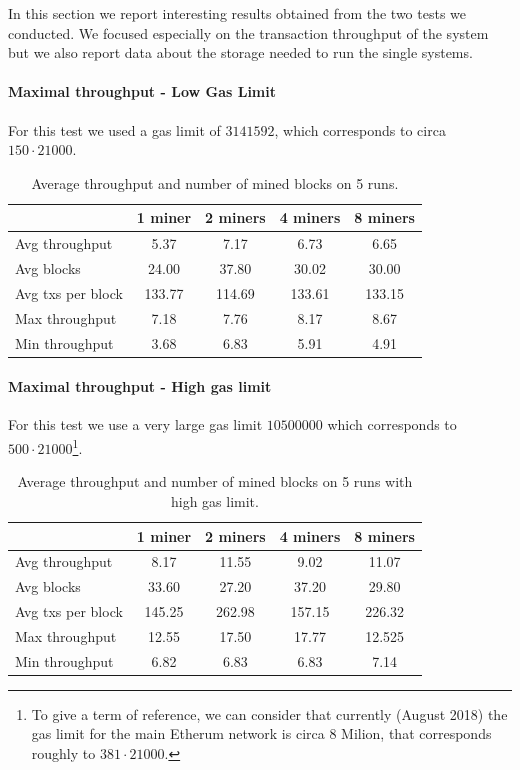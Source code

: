 In this section we report interesting results obtained from the two tests we
conducted. We focused especially on the transaction throughput of the system
but we also report data about the storage needed to run the single systems.  

\paragraph{Maximal throughput - Low Gas Limit}
\label{sec:max-troughput}
For this test we used a gas limit of $3141592$, which corresponds to circa
$150 \cdot 21000$.

\begin{table}[h]
  \centering
  \begin{tabular}{l | cccc}
    & 1 miner & 2 miners & 4 miners & 8 miners \\ \hline
    Avg throughput & 5.37 & 7.17 & 6.73 & 6.65 \\ 
    Avg blocks & 24.00 & 37.80 & 30.02 & 30.00 \\ 
    Avg txs per block & 133.77 & 114.69 & 133.61 & 133.15 \\ 
    Max throughput & 7.18 & 7.76 & 8.17 & 8.67 \\
    Min throughput & 3.68 & 6.83 & 5.91 & 4.91 \\
  \end{tabular}
  \caption{Average throughput and number of mined blocks on 5 runs.}
  \label{tab:max-troughput}
\end{table}


\paragraph{Maximal throughput - High gas limit}
\label{sec:max-throughput-high-gaslimit}
For this test we use a very large gas limit $10500000$ which corresponds to
$500 \cdot 21000$\footnote{To give a term of reference, we can consider that 
currently (August 2018) the gas limit for the main Etherum network is circa $8$ 
Milion, that corresponds roughly to $381 \cdot 21000$.}.

\begin{table}[h]
  \centering
  \begin{tabular}{l | cccc}
    & 1 miner & 2 miners & 4 miners & 8 miners \\ \hline
    Avg throughput & 8.17 & 11.55 & 9.02 & 11.07 \\
    Avg blocks & 33.60 & 27.20 & 37.20 & 29.80 \\
    Avg txs per block & 145.25 & 262.98 & 157.15 & 226.32  \\ 
    Max throughput & 12.55 & 17.50 & 17.77 & 12.525 \\
    Min throughput & 6.82 & 6.83 & 6.83 & 7.14 \\
  \end{tabular}
  \caption{Average throughput and number of mined blocks on 5 runs with high gas limit.}
  \label{tab:max-troughput-high-gaslimit}
\end{table}
